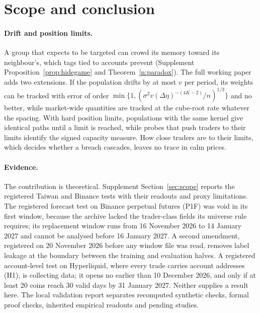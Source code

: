 \documentclass[12pt]{article}
\theoremstyle{definition}
\theoremstyle{remark}
\begin{document}
\section{Scope and conclusion}\label{n:concl}

\paragraph{Drift and position limits.} A group that expects to be targeted can crowd its memory toward its neighbour's, which tags tied to accounts prevent (Supplement Proposition~\ref{prop:hidegame} and Theorem~\ref{n:paradox}). The full working paper \citep{niroula2026full} adds two extensions. If the population drifts by at most $v$ per period, its weights can be tracked with error of order $\min\{1,(\sigma^2v(\Delta\eta)^{-(4K-2)}/n)^{1/3}\}$ and no better, while market-wide quantities are tracked at the cube-root rate whatever the spacing. With hard position limits, populations with the same kernel give identical paths until a limit is reached, while probes that push traders to their limits identify the signed capacity measure. How close traders are to their limits, which decides whether a breach cascades, leaves no trace in calm prices.


\paragraph{Evidence.} The contribution is theoretical. Supplement Section~\ref{sec:scope} reports the registered Taiwan and Binance tests with their readouts and proxy limitations. The registered forecast test on Binance perpetual futures (P1F) was void in its first window, because the archive lacked the trader-class fields its universe rule requires; its replacement window runs from 16 November 2026 to 14 January 2027 and cannot be analysed before 16 January 2027. A second amendment, registered on 20 November 2026 before any window file was read, removes label leakage at the boundary between the training and evaluation halves. A registered account-level test on Hyperliquid, where every trade carries account addresses (H1), is collecting data; it opens no earlier than 10 December 2026, and only if at least 20 coins reach 30 valid days by 31 January 2027. Neither supplies a result here. The local validation report separates recomputed synthetic checks, formal proof checks, inherited empirical readouts and pending studies.
\end{document}
